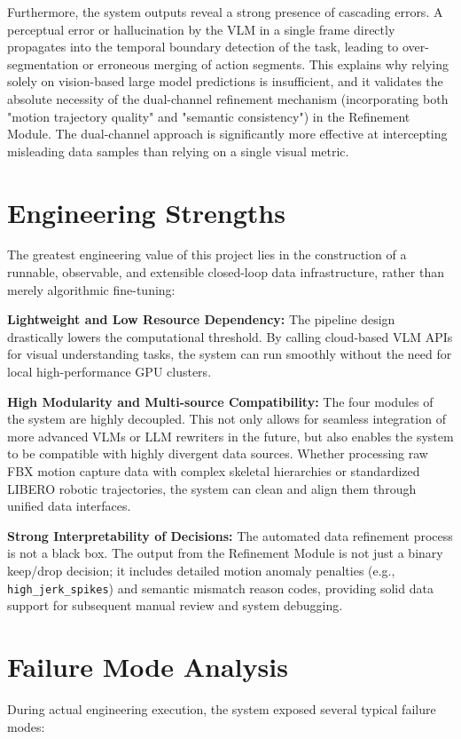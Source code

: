 \documentclass[11pt,oneside]{report}
\begin{document}
Furthermore, the system outputs reveal a strong presence of cascading errors. A perceptual error or hallucination by the VLM in a single frame directly propagates into the temporal boundary detection of the task, leading to over-segmentation or erroneous merging of action segments. This explains why relying solely on vision-based large model predictions is insufficient, and it validates the absolute necessity of the dual-channel refinement mechanism (incorporating both "motion trajectory quality" and "semantic consistency") in the Refinement Module. The dual-channel approach is significantly more effective at intercepting misleading data samples than relying on a single visual metric.

\section{Engineering Strengths}
The greatest engineering value of this project lies in the construction of a runnable, observable, and extensible closed-loop data infrastructure, rather than merely algorithmic fine-tuning:

\textbf{Lightweight and Low Resource Dependency:} The pipeline design drastically lowers the computational threshold. By calling cloud-based VLM APIs for visual understanding tasks, the system can run smoothly without the need for local high-performance GPU clusters.

\textbf{High Modularity and Multi-source Compatibility:} The four modules of the system are highly decoupled. This not only allows for seamless integration of more advanced VLMs or LLM rewriters in the future, but also enables the system to be compatible with highly divergent data sources. Whether processing raw FBX motion capture data with complex skeletal hierarchies or standardized LIBERO robotic trajectories, the system can clean and align them through unified data interfaces.

\textbf{Strong Interpretability of Decisions:} The automated data refinement process is not a black box. The output from the Refinement Module is not just a binary keep/drop decision; it includes detailed motion anomaly penalties (e.g., \texttt{high\_jerk\_spikes}) and semantic mismatch reason codes, providing solid data support for subsequent manual review and system debugging.

\section{Failure Mode Analysis}
During actual engineering execution, the system exposed several typical failure modes:
\end{document}
